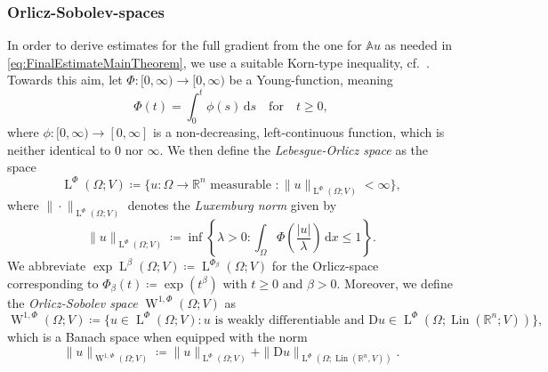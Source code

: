 \documentclass[a4paper,10pt,reqno,oneside]{amsart}
\numberwithin{equation}{section}
\newcommand{\R}{\mathbb R}
\newcommand{\Aop}{\mathbb{A}}
\newcommand{\lebe}{\operatorname{L}}
\newcommand{\sobo}{\operatorname{W}}
\newcommand{\D}{\mathrm{D}}
\DeclareMathOperator{\Lin}{Lin}
\newcommand{\dx}[1]{\,\mathrm{d}#1}
\newcommand{\abs}[1]{\left\lvert#1\right\rvert}
\begin{document}
\subsubsection{Orlicz-Sobolev-spaces} In order to derive estimates for the full gradient from the one for $\Aop u$ as needed in \eqref{eq:FinalEstimateMainTheorem}, we use a suitable Korn-type inequality, cf.~. Towards this aim, let $\Phi\colon [0,\infty)\to [0,\infty)$ be a Young-function, meaning
\begin{equation*}
\Phi(t) = \int_0^t \phi(s)\dx{s} \quad\mbox{for}\quad t\geq 0,
\end{equation*}
where $\phi:[0,\infty)\to [0,\infty]$ is a non-decreasing, left-continuous function, which is neither identical to $0$ nor $\infty$. We then define the \emph{Lebesgue-Orlicz space} as the space
\begin{equation*}
	\lebe^\Phi(\Omega;V)\coloneqq \{u\colon \Omega\to \R^n\mbox{  measurable  }\colon \|u\|_{\lebe^\Phi(\Omega;V)}<\infty\}, 
\end{equation*}
where $\|\cdot\|_{\lebe^\Phi(\Omega;V)}$ denotes the \emph{Luxemburg norm} given by
\begin{equation*}
	\|u\|_{\lebe^\Phi(\Omega;V)}\coloneqq \inf\left\{\lambda>0\colon \int_\Omega \Phi\left(\frac{\abs{u}}{\lambda}\right)\dx{x}\leq 1\right\}.
\end{equation*}
We abbreviate $\exp\lebe^\beta(\Omega;V)\coloneqq \lebe^{\Phi_\beta}(\Omega;V)$ for the Orlicz-space corresponding to $\Phi_\beta(t)\coloneqq \exp(t^\beta)$ with $t\geq 0$ and $\beta>0$. Moreover, we define the \emph{Orlicz-Sobolev space} $\sobo^{1,\Phi}(\Omega;V)$ as
\begin{equation*}
	\sobo^{1,\Phi}(\Omega;V)\coloneqq \{u\in \lebe^\Phi(\Omega;V)\colon u\mbox{ is weakly differentiable and }\D u\in \lebe^\Phi(\Omega;\Lin(\R^n;V))\},
\end{equation*}
which is a Banach space when equipped with the norm 
\begin{equation*}
	\|u\|_{\sobo^{1,\Phi}(\Omega;V)} \coloneqq \|u\|_{\lebe^\Phi(\Omega;V)} + \|\D u\|_{\lebe^\Phi(\Omega;\Lin(\R^n, V))}.
\end{equation*}

\end{document}
